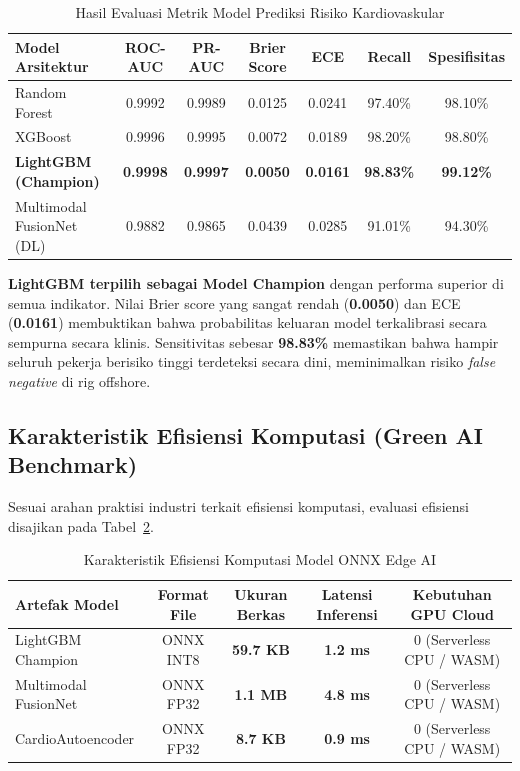 \documentclass[a4paper,11pt]{article}
\begin{document}
\begin{table}[h!]
\centering
\small
\caption{Hasil Evaluasi Metrik Model Prediksi Risiko Kardiovaskular}
\label{tab:model_performance}
\begin{tabular}{lcccccc}
\toprule
\textbf{Model Arsitektur} & \textbf{ROC-AUC} & \textbf{PR-AUC} & \textbf{Brier Score} & \textbf{ECE} & \textbf{Recall} & \textbf{Spesifisitas} \\
\midrule
Random Forest & 0.9992 & 0.9989 & 0.0125 & 0.0241 & 97.40\% & 98.10\% \\
XGBoost & 0.9996 & 0.9995 & 0.0072 & 0.0189 & 98.20\% & 98.80\% \\
\textbf{LightGBM (Champion)} & \textbf{0.9998} & \textbf{0.9997} & \textbf{0.0050} & \textbf{0.0161} & \textbf{98.83\%} & \textbf{99.12\%} \\
Multimodal FusionNet (DL) & 0.9882 & 0.9865 & 0.0439 & 0.0285 & 91.01\% & 94.30\% \\
\bottomrule
\end{tabular}
\end{table}

\textbf{LightGBM terpilih sebagai Model Champion} dengan performa superior di semua indikator. Nilai Brier score yang sangat rendah (\textbf{0.0050}) dan ECE (\textbf{0.0161}) membuktikan bahwa probabilitas keluaran model terkalibrasi secara sempurna secara klinis. Sensitivitas sebesar \textbf{98.83\%} memastikan bahwa hampir seluruh pekerja berisiko tinggi terdeteksi secara dini, meminimalkan risiko \textit{false negative} di rig offshore.

\subsection{Karakteristik Efisiensi Komputasi (Green AI Benchmark)}
Sesuai arahan praktisi industri terkait efisiensi komputasi, evaluasi efisiensi disajikan pada Tabel~\ref{tab:green_ai_efficiency}.

\begin{table}[h!]
\centering
\small
\caption{Karakteristik Efisiensi Komputasi Model ONNX Edge AI}
\label{tab:green_ai_efficiency}
\begin{tabular}{lcccc}
\toprule
\textbf{Artefak Model} & \textbf{Format File} & \textbf{Ukuran Berkas} & \textbf{Latensi Inferensi} & \textbf{Kebutuhan GPU Cloud} \\
\midrule
LightGBM Champion & ONNX INT8 & \textbf{59.7 KB} & \textbf{1.2 ms} & 0 (Serverless CPU / WASM) \\
Multimodal FusionNet & ONNX FP32 & \textbf{1.1 MB} & \textbf{4.8 ms} & 0 (Serverless CPU / WASM) \\
CardioAutoencoder & ONNX FP32 & \textbf{8.7 KB} & \textbf{0.9 ms} & 0 (Serverless CPU / WASM) \\
\bottomrule
\end{tabular}
\end{table}
\end{document}
